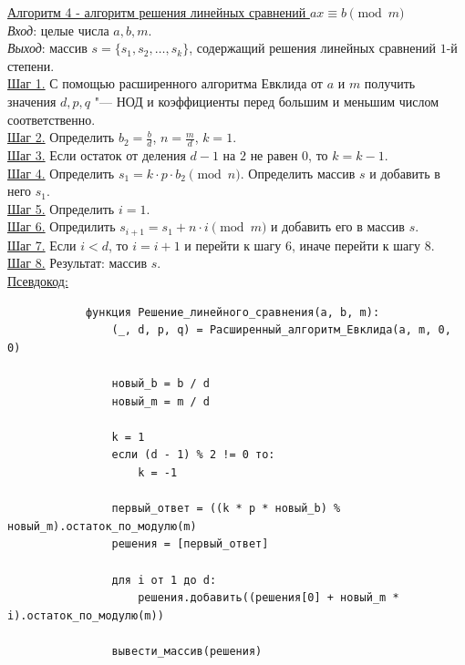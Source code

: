 \documentclass[bachelor, och, labwork]{shiza}
\begin{document}
        \underline{Алгоритм 4 - алгоритм решения линейных сравнений $ax \equiv b \pmod m$}\\
            \textit{Вход}: целые числа $a, b, m$.\\
            \textit{Выход}: массив $s = \{s_1, s_2, \dots, s_k\}$, содержащий
            решения линейных сравнений $1$-й степени.\\
            \underline{Шаг 1.} С помощью расширенного алгоритма Евклида от $a$ и
            $m$ получить значения $d, p, q$ "--- НОД и коэффициенты перед
            большим и меньшим числом соответственно.\\
            \underline{Шаг 2.} Определить $b_2 = \frac{b}{d}$, $n = \frac{m}{d}$, $k = 1$.\\
            \underline{Шаг 3.} Если остаток от деления $d - 1$ на $2$ не равен
            $0$, то $k = k - 1$. \\
            \underline{Шаг 4.} Определить $s_1 = k \cdot p \cdot b_2 \pmod n$.
            Определить массив $s$ и добавить в него $s_1$.\\
            \underline{Шаг 5.} Определить $i = 1$.\\
            \underline{Шаг 6.} Опредилить $s_{i+1} = s_1 + n \cdot i \pmod m$ и
            добавить его в массив $s$.\\
            \underline{Шаг 7.} Если $i < d$, то $i = i + 1$ и перейти к шагу
            $6$, иначе перейти к шагу $8$.\\
            \underline{Шаг 8.} Результат: массив $s$.\\

        \underline{Псевдокод:}
            \begin{verbatim}
            функция Решение_линейного_сравнения(a, b, m):
                (_, d, p, q) = Расширенный_алгоритм_Евклида(a, m, 0, 0)

                новый_b = b / d
                новый_m = m / d

                k = 1
                если (d - 1) % 2 != 0 то:
                    k = -1

                первый_ответ = ((k * p * новый_b) % новый_m).остаток_по_модулю(m)
                решения = [первый_ответ]

                для i от 1 до d:
                    решения.добавить((решения[0] + новый_m * i).остаток_по_модулю(m))

                вывести_массив(решения)
            \end{verbatim}
\end{document}
